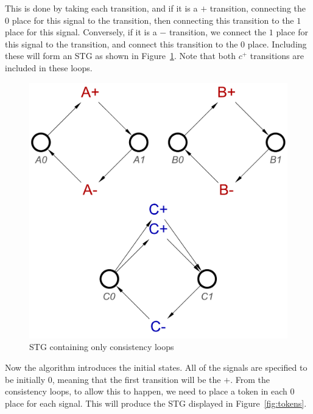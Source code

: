 \documentclass[british,conference,compsoc]{IEEEtran}
\begin{document}
This is done by taking each transition, and if it is a $+$ transition, 
connecting the $0$ place for this signal to the transition, then connecting 
this transition to the $1$ place for this signal. Conversely, if it is a $-$ 
transition, we connect the $1$ place for this signal to the transition, and 
connect this transition to the $0$ place. Including these will form an STG as 
shown in Figure~\ref{fig:loops}. Note that both $c^{+}$ transitions are 
included in these loops.

\begin{figure}[h]
\vspace{-4mm}
\begin{centering}
\includegraphics[scale=0.3]{Images/or-gate-loops-stg}
\par\end{centering}
\protect\caption{\label{fig:loops} STG containing only consistency loops}
\vspace{-1mm}
\end{figure}

Now the algorithm introduces the initial states. All of the signals are 
specified to be initially 0, meaning that the first transition will be the $+$.
From the consistency loops, to allow this to happen, we need to place a token 
in each $0$ place for each signal. This will produce the STG displayed in 
Figure~\ref{fig:tokens}.
\end{document}
